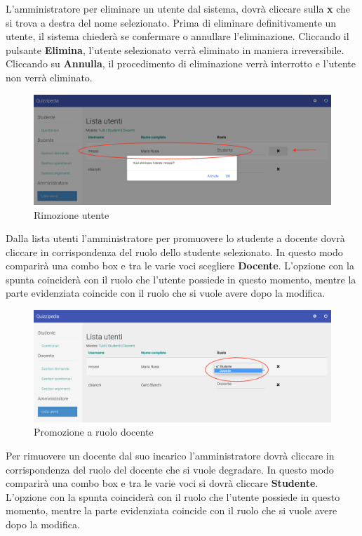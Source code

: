 \documentclass[12pt,a4paper]{article}
\begin{document}
	L'amministratore per eliminare un utente dal sistema, dovrà cliccare sulla \textbf{x} che si trova a destra del nome selezionato. Prima di eliminare definitivamente un utente, il sistema chiederà se confermare o annullare l'eliminazione. Cliccando il pulsante \textbf{Elimina}, l'utente selezionato verrà eliminato in maniera irreversibile. Cliccando su \textbf{Annulla}, il procedimento di eliminazione verrà interrotto e l'utente non verrà eliminato.
		\begin{figure}[H]
			\centering
			\includegraphics[width=1\linewidth]{../img/screenshot/rimozioneUtente.png}
			\caption{Rimozione utente}
			\label{Rimozione utente}
		\end{figure}
	Dalla lista utenti l'amministratore per promuovere lo studente a docente dovrà cliccare in corrispondenza del ruolo dello studente selezionato. In questo modo comparirà una combo box e tra le varie voci scegliere \textbf{Docente}. L'opzione con la spunta coinciderà con il ruolo che l'utente possiede in questo momento, mentre la parte evidenziata coincide con il ruolo che si vuole avere dopo la modifica.
	
	\begin{figure}[H]
		\centering
		\includegraphics[width=1\linewidth]{../img/screenshot/cambioRuoloStudDoc.png}
		\caption{Promozione a ruolo docente}
		\label{Promozione a ruolo docente}
	\end{figure}
	
	Per rimuovere un docente dal suo incarico l'amministratore dovrà cliccare in corrispondenza del ruolo del docente che si vuole degradare. In questo modo comparirà una combo box e tra le varie voci si dovrà cliccare \textbf{Studente}.
	L'opzione con la spunta coinciderà con il ruolo che l'utente possiede in questo momento, mentre la parte evidenziata coincide con il ruolo che si vuole avere dopo la modifica.
	
\end{document}
